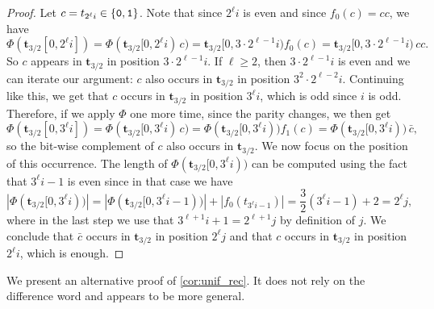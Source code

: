 \documentclass[12pt,reqno]{article}
\begin{document}
\begin{proof}
Let $c = t_{2^\ell i} \in \{{\tt 0},{\tt 1}\}$. 
Note that since $2^\ell i$ is even and since $f_0(c)=cc$, we have 
\[  \Phi(\mathbf{t}_{3/2}[0,2^\ell i]) = \Phi(\mathbf{t}_{3/2}[0,2^\ell i)\, c) = 
    \mathbf{t}_{3/2}[0,3\cdot 2^{\ell-1}i) f_0(c) = 
        \mathbf{t}_{3/2}[0,3\cdot 2^{\ell-1}i)\, cc. \]
So $c$ appears in $\mathbf{t}_{3/2}$ in position $3\cdot 2^{\ell-1} i$.
If $\ell \ge 2$, then $3\cdot 2^{\ell-1} i$ is even and we can iterate our argument: $c$ also occurs in $\mathbf{t}_{3/2}$ in position $3^2\cdot 2^{\ell-2}i$. 
Continuing like this, we get that $c$ occurs in $\mathbf{t}_{3/2}$ in position $3^\ell i$, which is odd since $i$ is odd.
Therefore, if we apply $\Phi$ one more time, since the parity changes, we then get
\[  \Phi(\mathbf{t}_{3/2}[0,3^\ell i]) = \Phi(\mathbf{t}_{3/2}[0,3^\ell i)\, c) = 
    \Phi(\mathbf{t}_{3/2}[0,3^\ell i)) f_1(c) = 
    \Phi(\mathbf{t}_{3/2}[0,3^\ell i))\, \bar{c},\]
so the bit-wise complement of $c$ also occurs in $\mathbf{t}_{3/2}$.
We now focus on the position of this occurrence.
The length of $\Phi(\mathbf{t}_{3/2}[0,3^\ell i))$ can be computed using the fact that $3^\ell i - 1$ is even since in that case we have
\[  |\Phi(\mathbf{t}_{3/2}[0,3^\ell i))| = |\Phi(\mathbf{t}_{3/2}[0,3^\ell i-1))|
   + |f_0(t_{3^\ell i-1})| =
        \frac{3}{2}(3^\ell i - 1) + 2 = 2^\ell j,  \]
where in the last step we use that $3^{\ell+1}i + 1 = 2^{\ell+1}j$ by definition of $j$.
We conclude that $\bar{c}$ occurs in $\mathbf{t}_{3/2}$ in position $2^\ell j$ and that $c$ occurs in $\mathbf{t}_{3/2}$ in position $2^\ell i$,  which is enough.
\end{proof}



We present an alternative proof of \cref{cor:unif_rec}. 
It does not rely on the difference word and appears to be more general.
\end{document}
